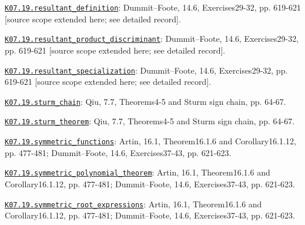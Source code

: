 \par\smallskip\noindent\hypertarget{src:K07.19.resultant_definition}{}\label{src:K07.19.resultant_definition}\hyperref[K07.19.resultant_definition]{\texttt{K07.19.resultant\_definition}}: Dummit--Foote, 14.6, Exercises29-32, pp. 619-621 [source scope extended here; see detailed record].
\par\smallskip\noindent\hypertarget{src:K07.19.resultant_product_discriminant}{}\label{src:K07.19.resultant_product_discriminant}\hyperref[K07.19.resultant_product_discriminant]{\texttt{K07.19.resultant\_product\_discriminant}}: Dummit--Foote, 14.6, Exercises29-32, pp. 619-621 [source scope extended here; see detailed record].
\par\smallskip\noindent\hypertarget{src:K07.19.resultant_specialization}{}\label{src:K07.19.resultant_specialization}\hyperref[K07.19.resultant_specialization]{\texttt{K07.19.resultant\_specialization}}: Dummit--Foote, 14.6, Exercises29-32, pp. 619-621 [source scope extended here; see detailed record].
\par\smallskip\noindent\hypertarget{src:K07.19.sturm_chain}{}\label{src:K07.19.sturm_chain}\hyperref[K07.19.sturm_chain]{\texttt{K07.19.sturm\_chain}}: Qiu, 7.7, Theorems4-5 and Sturm sign chain, pp. 64-67.
\par\smallskip\noindent\hypertarget{src:K07.19.sturm_theorem}{}\label{src:K07.19.sturm_theorem}\hyperref[K07.19.sturm_theorem]{\texttt{K07.19.sturm\_theorem}}: Qiu, 7.7, Theorems4-5 and Sturm sign chain, pp. 64-67.
\par\smallskip\noindent\hypertarget{src:K07.19.symmetric_functions}{}\label{src:K07.19.symmetric_functions}\hyperref[K07.19.symmetric_functions]{\texttt{K07.19.symmetric\_functions}}: Artin, 16.1, Theorem16.1.6 and Corollary16.1.12, pp. 477-481; Dummit--Foote, 14.6, Exercises37-43, pp. 621-623.
\par\smallskip\noindent\hypertarget{src:K07.19.symmetric_polynomial_theorem}{}\label{src:K07.19.symmetric_polynomial_theorem}\hyperref[K07.19.symmetric_polynomial_theorem]{\texttt{K07.19.symmetric\_polynomial\_theorem}}: Artin, 16.1, Theorem16.1.6 and Corollary16.1.12, pp. 477-481; Dummit--Foote, 14.6, Exercises37-43, pp. 621-623.
\par\smallskip\noindent\hypertarget{src:K07.19.symmetric_root_expressions}{}\label{src:K07.19.symmetric_root_expressions}\hyperref[K07.19.symmetric_root_expressions]{\texttt{K07.19.symmetric\_root\_expressions}}: Artin, 16.1, Theorem16.1.6 and Corollary16.1.12, pp. 477-481; Dummit--Foote, 14.6, Exercises37-43, pp. 621-623.
